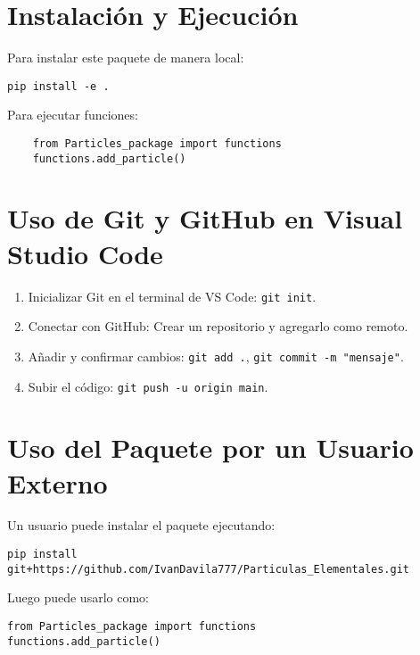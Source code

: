 \documentclass{article}
\begin{document}
\section{Instalación y Ejecución}
Para instalar este paquete de manera local:

\begin{verbatim}
pip install -e .
\end{verbatim}

Para ejecutar funciones:

\begin{verbatim}
    from Particles_package import functions
    functions.add_particle()
\end{verbatim}

\section{Uso de Git y GitHub en Visual Studio Code}
\begin{enumerate}
    \item Inicializar Git en el terminal de VS Code: \texttt{git init}.
    \item Conectar con GitHub: Crear un repositorio y agregarlo como remoto.
    \item Añadir y confirmar cambios: \texttt{git add .}, \texttt{git commit -m "mensaje"}.
    \item Subir el código: \texttt{git push -u origin main}.
\end{enumerate}

\section{Uso del Paquete por un Usuario Externo}
Un usuario puede instalar el paquete ejecutando:

\begin{verbatim}
pip install git+https://github.com/IvanDavila777/Particulas_Elementales.git
\end{verbatim}

Luego puede usarlo como:

\begin{verbatim}
from Particles_package import functions
functions.add_particle()
\end{verbatim}
\end{document}
